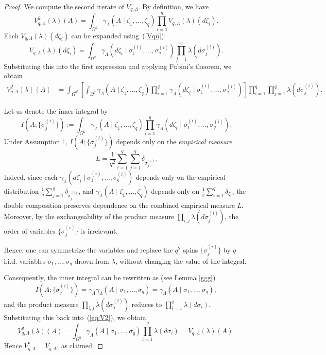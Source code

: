 \documentclass[11pt,reqno]{amsart}
\numberwithin{equation}{section} \setcounter{tocdepth}{1}
\begin{document}
\begin{proof}
	We compute the second iterate of $V_{q,\Lambda}$. By definition, we have
	$$
	V_{q,\Lambda}^2(\lambda)(A)
	= \int_{\Omega^q} \gamma_\Lambda(A \mid \zeta_1, \dots, \zeta_q)
	\prod_{i=1}^q V_{q,\Lambda}(\lambda)(d\zeta_i).
	$$
	Each $V_{q,\Lambda}(\lambda)(d\zeta_i)$ can be expanded using~(\ref{Vqu}):
	$$
	V_{q,\Lambda}(\lambda)(d\zeta_i)
	= \int_{\Omega^q} \gamma_\Lambda(d\zeta_i \mid \sigma^{(i)}_1, \dots, \sigma^{(i)}_q)
	\prod_{j=1}^q \lambda(d\sigma^{(i)}_j).
	$$
	Substituting this into the first expression and applying Fubini's theorem, we obtain
	\begin{equation}\label{eq:V2}
		\begin{aligned}
			V_{q,\Lambda}^2(\lambda)(A)
			&= \int_{\Omega^{q^2}} \left[
			\int_{\Omega^q} \gamma_\Lambda(A \mid \zeta_1, \dots, \zeta_q)
			\prod_{i=1}^q \gamma_\Lambda(d\zeta_i \mid \sigma^{(i)}_1, \dots, \sigma^{(i)}_q)
			\right] \prod_{i=1}^q \prod_{j=1}^q \lambda(d\sigma^{(i)}_j).
		\end{aligned}
	\end{equation}
	
	Let us denote the inner integral by
	$$
	I(A; \{\sigma^{(i)}_j\})
	:= \int_{\Omega^q} \gamma_\Lambda(A \mid \zeta_1, \dots, \zeta_q)
	\prod_{i=1}^q \gamma_\Lambda(d\zeta_i \mid \sigma^{(i)}_1, \dots, \sigma^{(i)}_q).
	$$
	Under Assumption 1, $I(A; \{\sigma^{(i)}_j\})$
	depends only on the \emph{empirical measure}
	$$
	L = \frac{1}{q^2} \sum_{i=1}^q \sum_{j=1}^q \delta_{\sigma^{(i)}_j}.
	$$
	Indeed, since each $\gamma_\Lambda(d\zeta_i \mid \sigma^{(i)}_1, \dots, \sigma^{(i)}_q)$
	depends only on the empirical distribution
	$\frac{1}{q} \sum_{j=1}^q \delta_{\sigma^{(i)}_j}$,
	and $\gamma_\Lambda(A \mid \zeta_1, \dots, \zeta_q)$ depends only on
	$\frac{1}{q} \sum_{i=1}^q \delta_{\zeta_i}$,
	the double composition preserves dependence on the combined empirical measure $L$.
	Moreover, by the exchangeability of the product measure
	$\prod_{i,j} \lambda(d\sigma^{(i)}_j)$,
	the order of variables $\{\sigma^{(i)}_j\}$ is irrelevant.
	
	Hence, one can symmetrize the variables and replace the $q^2$ spins
	$\{\sigma^{(i)}_j\}$ by $q$ i.i.d. variables
	$\sigma_1, \dots, \sigma_q$ drawn from $\lambda$,
	without changing the value of the integral.
		
	Consequently, the inner integral can be rewritten as (see Lemma \ref{ggg})
	$$
	I(A; \{\sigma^{(i)}_j\})=\gamma_\Lambda\gamma_\Lambda(A \mid \sigma_1, \dots, \sigma_q)
	= \gamma_\Lambda(A \mid \sigma_1, \dots, \sigma_q),
	$$
	and the product measure $\prod_{i,j} \lambda(d\sigma^{(i)}_j)$
	reduces to $\prod_{i=1}^q \lambda(d\sigma_i)$.
	Substituting this back into~(\ref{eq:V2}), we obtain
	$$
	V_{q,\Lambda}^2(\lambda)(A)
	= \int_{\Omega^q} \gamma_\Lambda(A \mid \sigma_1, \dots, \sigma_q)
	\prod_{i=1}^q \lambda(d\sigma_i)
	= V_{q,\Lambda}(\lambda)(A).
	$$
	Hence $V_{q,\Lambda}^2 = V_{q,\Lambda}$, as claimed.
\end{proof}
\end{document}
